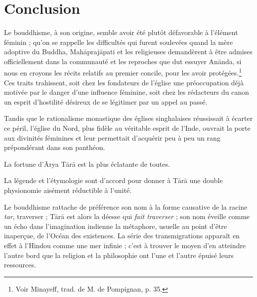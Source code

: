 \documentclass[a4paper, 11pt, oneside, french, landscape, twocolumn]{article}
\begin{document}
\section{Conclusion}
\paragraph{}
Le bouddhisme, à son origine, semble avoir été plutôt défavorable à l'élément féminin ; qu'on se rappelle les difficultés qui furent soulevées quand la mère adoptive du Buddha, Mah\={a}praj\={a}pati et les religieuses demandèrent à être admises officiellement dans la communauté et les reproches que dut essuyer An\={a}nda, si nous en croyons les récits relatifs au premier concile, pour les avoir protégées.\footnote{Voir Minayeff, trad. de M. de Pompignan, p. 35.} Ces traits trahissent, soit chez les fondateurs de l'église une préoccupation déjà motivée par le danger d'une influence féminine, soit chez les rédacteurs du canon un esprit d'hostilité désireux de se légitimer par un appel au passé.

Tandis que le rationalisme monastique des églises singhalaises réussissait à écarter ce péril, l'église du Nord, plus fidèle au véritable esprit de l'Inde, ouvrait la porte aux divinités féminines et leur permettait d'acquérir peu à peu un rang prépondérant dans son panthéon.

La fortune d'\={A}rya T\={a}r\={a} est la plus éclatante de toutes.

La légende et l'étymologie sont d'accord pour donner à T\={a}r\={a} une double physionomie aisément réductible à l'unité.

Le bouddhisme rattache de préférence son nom à la forme causative de la racine \emph{tar}, traverser ; T\={a}r\={a} est alors la déesse qui \emph{fait traverser} ; son nom éveille comme un écho dans l'imagination indienne la métaphore, usuelle au point d'être inaperçue, de l'Océan des existences. La série des transmigrations apparaît en effet à l'Hindou comme une mer infinie ; c'est à trouver le moyen d'en atteindre l'autre bord que la religion et la philosophie ont l'une et l'autre épuisé leurs ressources.
\end{document}
